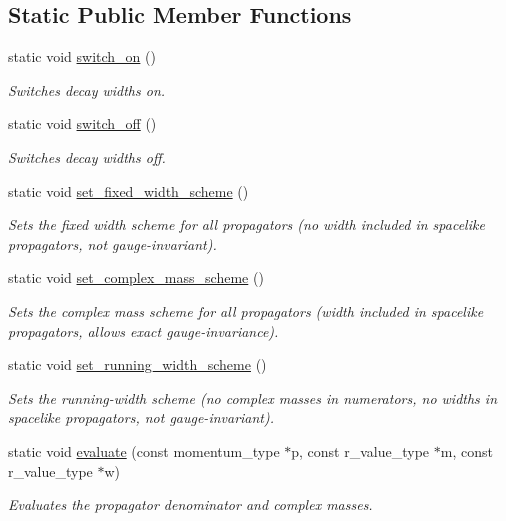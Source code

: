 \subsection*{Static Public Member Functions}
\begin{DoxyCompactItemize}
\item 
\hypertarget{a00578_addc9d8521f00c9a7a7d6a95dec92f690}{static void \hyperlink{a00578_addc9d8521f00c9a7a7d6a95dec92f690}{switch\-\_\-on} ()}\label{a00578_addc9d8521f00c9a7a7d6a95dec92f690}

\begin{DoxyCompactList}\small\item\em Switches decay widths on. \end{DoxyCompactList}\item 
\hypertarget{a00578_a5d2ec56553381befe2b8325825707bc9}{static void \hyperlink{a00578_a5d2ec56553381befe2b8325825707bc9}{switch\-\_\-off} ()}\label{a00578_a5d2ec56553381befe2b8325825707bc9}

\begin{DoxyCompactList}\small\item\em Switches decay widths off. \end{DoxyCompactList}\item 
static void \hyperlink{a00578_aea7e3012da06c62d52658d10d8aff899}{set\-\_\-fixed\-\_\-width\-\_\-scheme} ()
\begin{DoxyCompactList}\small\item\em Sets the fixed width scheme for all propagators (no width included in spacelike propagators, not gauge-\/invariant). \end{DoxyCompactList}\item 
static void \hyperlink{a00578_ab66801bcee8fd7a0a7b0b31b8d3b78a9}{set\-\_\-complex\-\_\-mass\-\_\-scheme} ()
\begin{DoxyCompactList}\small\item\em Sets the complex mass scheme for all propagators (width included in spacelike propagators, allows exact gauge-\/invariance). \end{DoxyCompactList}\item 
static void \hyperlink{a00578_a6aa165a9a785eb084d64a85eacaef6ce}{set\-\_\-running\-\_\-width\-\_\-scheme} ()
\begin{DoxyCompactList}\small\item\em Sets the running-\/width scheme (no complex masses in numerators, no widths in spacelike propagators, not gauge-\/invariant). \end{DoxyCompactList}\item 
\hypertarget{a00578_ab4bf29edf1e9b2c179dca861b61e9e4a}{static void \hyperlink{a00578_ab4bf29edf1e9b2c179dca861b61e9e4a}{evaluate} (const momentum\-\_\-type $\ast$p, const r\-\_\-value\-\_\-type $\ast$m, const r\-\_\-value\-\_\-type $\ast$w)}\label{a00578_ab4bf29edf1e9b2c179dca861b61e9e4a}

\begin{DoxyCompactList}\small\item\em Evaluates the propagator denominator and complex masses. \end{DoxyCompactList}\end{DoxyCompactItemize}
